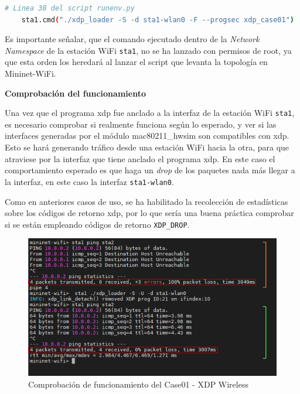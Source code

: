 \begin{lstlisting}[language= bash, style=Consola, caption={Carga del programa XDP - Case01},label=code:case01_xdp_wifi_load]
    # Linea 38 del script runenv.py
    sta1.cmd("./xdp_loader -S -d sta1-wlan0 -F --progsec xdp_case01")
\end{lstlisting}
\newpage
Es importante señalar, que el comando ejecutado dentro de la \textit{Network Namespace} de la estación WiFi \texttt{sta1}, no se ha lanzado con permisos de root, ya que esta orden los heredará al lanzar el script que levanta la topología en Mininet-WiFi. 

\vspace{1cm}
\textbf{Comprobación del funcionamiento}\\
\par

Una vez que el programa \gls{xdp} fue anclado a la interfaz de la estación WiFi \texttt{sta1}, es necesario comprobar si realmente funciona según lo esperado, y ver si las interfaces generadas por el módulo mac80211\_hwsim son compatibles con \gls{xdp}. Esto se hará generando tráfico desde una estación WiFi hacia la otra, para que atraviese por la interfaz que tiene anclado el programa \gls{xdp}. En este caso el comportamiento esperado es que haga un \textit{drop} de los paquetes nada más llegar a la interfaz, en este caso la interfaz \texttt{sta1-wlan0}.\\
\par
Como en anteriores casos de uso, se ha habilitado la recolección de estadísticas sobre los códigos de retorno \gls{xdp}, por lo que sería una buena práctica comprobar si se están empleando códigos de retorno \texttt{XDP\_DROP}.


\begin{figure}[ht]
    \centering
    \includegraphics[width=14cm]{archivos/img/dev/xdp-wifi/case01/demo_case01_edited.png}
    \caption{Comprobación de funcionamiento del Case01 - XDP Wireless}
    \label{fig:case01_xdp_wifi_func}
\end{figure}

